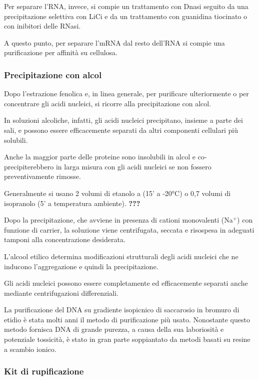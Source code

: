 \documentclass[]{article}
\begin{document}
Per separare l'RNA, invece, si compie un trattamento con Dnasi seguito
da una precipitazione selettiva con LiCi e da un trattamento con
guanidina tiocinato o con inibitori delle RNasi.

A questo punto, per separare l'mRNA dal resto dell'RNA si compie una
purificazione per affinità su cellulosa.

\subsubsection{Precipitazione con alcol}\label{precipitazione-con-alcol}

Dopo l'estrazione fenolica e, in linea generale, per purificare
ulteriormente o per concentrare gli acidi nucleici, si ricorre alla
precipitazione con alcol.

In soluzioni alcoliche, infatti, gli acidi nucleici precipitano, insieme
a parte dei sali, e possono essere efficacemente separati da altri
componenti cellulari più solubili.

Anche la maggior parte delle proteine sono insolubili in alcol e co-
precipiterebbero in larga misura con gli acidi nucleici se non fossero
preventivamente rimosse.

Generalmente si usano 2 volumi di etanolo a (15' a -20°C) o 0,7 volumi
di isopranolo (5' a temperatura ambiente). \textbf{???}

Dopo la precipitazione, che avviene in presenza di cationi monovalenti
(Na\(^+\)) con funzione di carrier, la soluzione viene centrifugata,
seccata e risospesa in adeguati tamponi alla concentrazione desiderata.

L'alcool etilico determina modificazioni strutturali degli acidi
nucleici che ne inducono l'aggregazione e quindi la precipitazione.

Gli acidi nucleici possono essere completamente ed efficacemente
separati anche mediante centrifugazioni differenziali.

La purificazione del DNA su gradiente isopicnico di saccarosio in
bromuro di etidio è stata molti anni il metodo di purificazione più
usato. Nonostante questo metodo fornisca DNA di grande purezza, a causa
della sua laboriosità e potenziale tossicità, è stato in gran parte
soppiantato da metodi basati su resine a scambio ionico.

\subsubsection{Kit di rupificazione}\label{kit-di-rupificazione}
\end{document}
